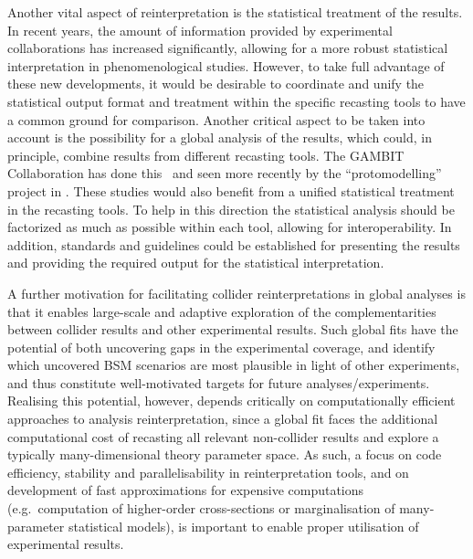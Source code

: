 \documentclass[11pt]{article}
\begin{document}
Another vital aspect of reinterpretation is the statistical treatment of the results. In recent years, the amount of information provided by experimental collaborations has increased significantly, allowing for a more robust statistical interpretation in phenomenological studies. However, to take full advantage of these new developments, it would be desirable to coordinate and unify the statistical output format and treatment within the specific recasting tools to have a common ground for comparison. Another critical aspect to be taken into account is the possibility for a global analysis of the results, which could, in principle, combine results from different recasting tools. The GAMBIT Collaboration has done this~\cite{Kvellestad:2019vxm} and seen more recently by the ``protomodelling'' project in \cite{Waltenberger:2020ygp}.
These studies would also benefit from a unified statistical treatment in the recasting tools. 
To help in this direction the statistical analysis should be factorized as much as possible within each tool, allowing for interoperability. In addition,  standards and guidelines could be established for presenting the results and providing the required output for the statistical interpretation.

A further motivation for facilitating collider reinterpretations in global analyses is that it enables large-scale and adaptive exploration of the complementarities between collider results and other experimental results. Such global fits have the potential of both uncovering gaps in the experimental coverage, and identify which uncovered BSM scenarios are most plausible in light of other experiments, and thus constitute well-motivated targets for future analyses/experiments. Realising this potential, however, depends critically on computationally efficient approaches to analysis reinterpretation, since a global fit faces the additional computational cost of recasting all relevant non-collider results and explore a typically many-dimensional theory parameter space. As such, a focus on code efficiency, stability and parallelisability in reinterpretation tools, and on development of fast approximations for expensive computations (e.g.~computation of higher-order cross-sections or marginalisation of many-parameter statistical models), is important to enable proper utilisation of experimental results.
\end{document}
